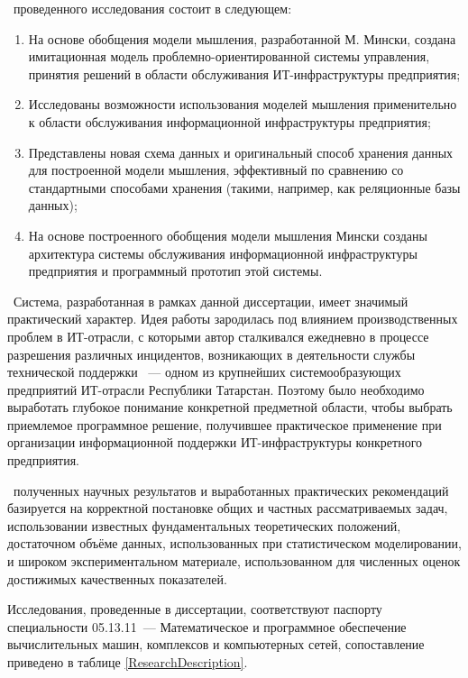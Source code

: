 \novelty\ проведенного исследования состоит в следующем:
\begin{enumerate}
  \item На основе обобщения модели мышления, разработанной М. Мински, создана имитационная модель проблемно-ориентированной системы управления, принятия решений в области обслуживания ИТ-инфраструктуры предприятия;
  \item Исследованы возможности использования моделей мышления применительно к области обслуживания информационной инфраструктуры предприятия;
  \item Представлены новая схема данных и оригинальный способ хранения данных для построенной модели мышления, эффективный по сравнению со стандартными способами хранения (такими, например, как реляционные базы данных);
  \item На основе построенного обобщения модели мышления Мински созданы архитектура системы обслуживания информационной инфраструктуры предприятия и программный прототип этой системы.
\end{enumerate}

\influence\ 
Система, разработанная в рамках данной диссертации, имеет значимый практический характер. Идея работы зародилась под влиянием производственных проблем в ИТ-отрасли, с которыми автор сталкивался ежедневно в процессе разрешения различных инцидентов, возникающих в деятельности службы технической поддержки \icl~--- одном из крупнейших системообразующих предприятий ИТ-отрасли Республики Татарстан. Поэтому было необходимо выработать глубокое понимание конкретной предметной области, чтобы выбрать приемлемое программное решение, получившее практическое применение при организации информационной поддержки ИТ-инфраструктуры конкретного предприятия. \par
\reliability\ полученных научных результатов и выработанных практических рекомендаций базируется на корректной постановке общих и частных рассматриваемых задач,  использовании известных фундаментальных теоретических положений, достаточном объёме данных, использованных при статистическом моделировании, и широком экспериментальном материале, использованном для численных оценок достижимых качественных показателей. \par 
Исследования, проведенные в диссертации, соответствуют паспорту специальности 05.13.11~--- Математическое и программное обеспечение вычислительных машин, комплексов и компьютерных сетей, сопоставление приведено в таблице \ref{ResearchDescription}.

